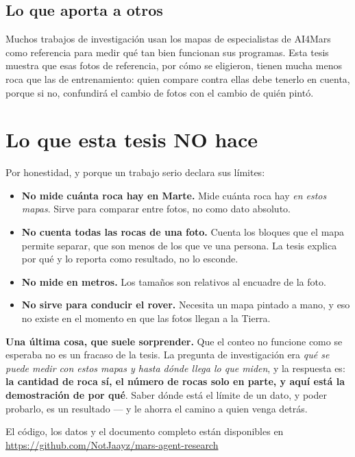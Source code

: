 \documentclass[12pt]{article}
\begin{document}
\subsection*{Lo que aporta a otros}

Muchos trabajos de investigación usan los mapas de especialistas de AI4Mars como referencia
para medir qué tan bien funcionan sus programas. Esta tesis muestra que esas fotos de
referencia, por cómo se eligieron, tienen mucha menos roca que las de entrenamiento: quien
compare contra ellas debe
tenerlo en cuenta, porque si no, confundirá el cambio de fotos con el cambio de quién pintó.

\section{Lo que esta tesis NO hace}

Por honestidad, y porque un trabajo serio declara sus límites:

\begin{itemize}\itemsep4pt
  \item \textbf{No mide cuánta roca hay en Marte.} Mide cuánta roca hay \textit{en estos
    mapas}. Sirve para comparar entre fotos, no como dato absoluto.
  \item \textbf{No cuenta todas las rocas de una foto.} Cuenta los bloques que el mapa
    permite separar, que son menos de los que ve una persona. La tesis explica por qué y lo
    reporta como resultado, no lo esconde.
  \item \textbf{No mide en metros.} Los tamaños son relativos al encuadre de la foto.
  \item \textbf{No sirve para conducir el rover.} Necesita un mapa pintado a mano, y eso no
    existe en el momento en que las fotos llegan a la Tierra.
\end{itemize}

\begin{idea}
\noindent\textbf{Una última cosa, que suele sorprender.} Que el conteo no funcione como se
esperaba no es un fracaso de la tesis. La pregunta de investigación era \textit{qué se puede
medir con estos mapas y hasta dónde llega lo que miden}, y la respuesta es: \textbf{la
cantidad de roca sí, el número de rocas solo en parte, y aquí está la demostración de por
qué}. Saber dónde está el límite de un dato, y poder probarlo, es un resultado — y le ahorra
el camino a quien venga detrás.
\end{idea}

\vfill
\begin{center}
\small\color{gris}
El código, los datos y el documento completo están disponibles en\\
\url{https://github.com/NotJaayz/mars-agent-research}
\end{center}
\end{document}
